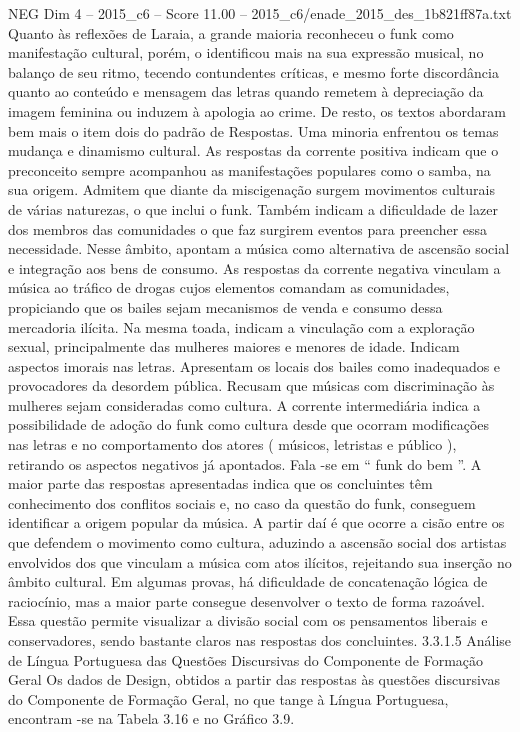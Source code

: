 \begin{textsample}{NEG Dim 4 – 2015\_c6 – Score 11.00 – 2015\_c6/enade\_2015\_des\_1b821ff87a.txt}
Quanto às reflexões de Laraia, a grande maioria reconheceu o funk como manifestação cultural, porém, o identificou mais na sua expressão musical, no balanço de seu ritmo, tecendo contundentes críticas, e mesmo forte discordância quanto ao conteúdo e mensagem das letras quando remetem à depreciação da imagem feminina ou induzem à apologia ao crime.
De resto, os textos abordaram bem mais o item dois do padrão de Respostas.
Uma minoria enfrentou os temas mudança e dinamismo cultural.
As respostas da corrente positiva indicam que o preconceito sempre acompanhou as manifestações populares como o samba, na sua origem.
Admitem que diante da miscigenação surgem movimentos culturais de várias naturezas, o que inclui o funk.
Também indicam a dificuldade de lazer dos membros das comunidades o que faz surgirem eventos para preencher essa necessidade.
Nesse âmbito, apontam a música como alternativa de ascensão social e integração aos bens de consumo.
As respostas da corrente negativa vinculam a música ao tráfico de drogas cujos elementos comandam as comunidades, propiciando que os bailes sejam mecanismos de venda e consumo dessa mercadoria ilícita.
Na mesma toada, indicam a vinculação com a exploração sexual, principalmente das mulheres maiores e menores de idade.
Indicam aspectos imorais nas letras.
Apresentam os locais dos bailes como inadequados e provocadores da desordem pública.
Recusam que músicas com discriminação às mulheres sejam consideradas como cultura.
A corrente intermediária indica a possibilidade de adoção do funk como cultura desde que ocorram modificações nas letras e no comportamento dos atores ( músicos, letristas e público ), retirando os aspectos negativos já apontados.
Fala -se em “ funk do bem ”.
A maior parte das respostas apresentadas indica que os concluintes têm conhecimento dos conflitos sociais e, no caso da questão do funk, conseguem identificar a origem popular da música.
A partir daí é que ocorre a cisão entre os que defendem o movimento como cultura, aduzindo a ascensão social dos artistas envolvidos dos que vinculam a música com atos ilícitos, rejeitando sua inserção no âmbito cultural.
Em algumas provas, há dificuldade de concatenação lógica de raciocínio, mas a maior parte consegue desenvolver o texto de forma razoável.
Essa questão permite visualizar a divisão social com os pensamentos liberais e conservadores, sendo bastante claros nas respostas dos concluintes. 3.3.1.5 Análise de Língua Portuguesa das Questões Discursivas do Componente de Formação Geral Os dados de Design, obtidos a partir das respostas às questões discursivas do Componente de Formação Geral, no que tange à Língua Portuguesa, encontram -se na Tabela 3.16 e no Gráfico 3.9.

\end{textsample}
